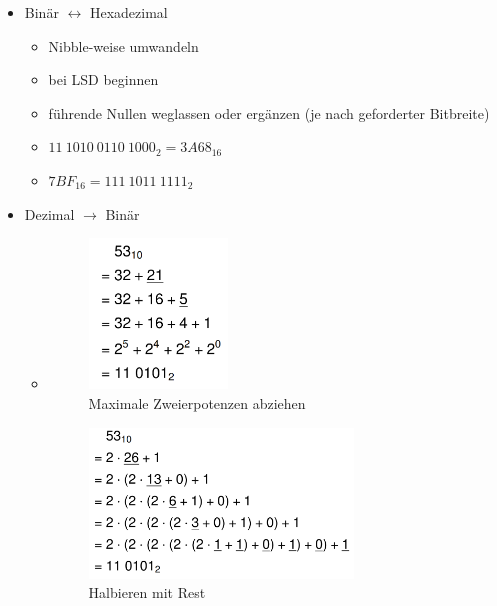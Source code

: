 \documentclass[11pt,a4paper]{article}
\begin{document}
\begin{itemize}
\begin{itemize}
	\item Binär $\leftrightarrow$ Hexadezimal
		\begin{itemize}
		\item Nibble-weise umwandeln
		\item bei LSD beginnen 
		\item führende Nullen weglassen oder ergänzen (je nach geforderter Bitbreite)
		\item $11~1010~0110~1000_2 = 3A68_{16}$
		\item $7BF_{16} = 111~1011~1111_2$
		\end{itemize}
		
	\item Dezimal $\rightarrow$ Binär
		\begin{itemize}
		
		\item[]
			\begin{minipage}{0.3\textwidth}
				\begin{figure}[H]
				\includegraphics[height=4cm]{Bilder/dtob1}
				\caption{Maximale Zweierpotenzen abziehen}
				\end{figure}
			\end{minipage}
			\begin{minipage}[t]{0.35\textwidth}
				\begin{figure}[H]
				\vspace{-3cm}
				\includegraphics[height=4cm]{Bilder/dtob2}
				\caption{Halbieren mit Rest}
				\end{figure}
			\end{minipage}
		
		\end{itemize}
	

\end{itemize}
\end{itemize}
\end{document}
